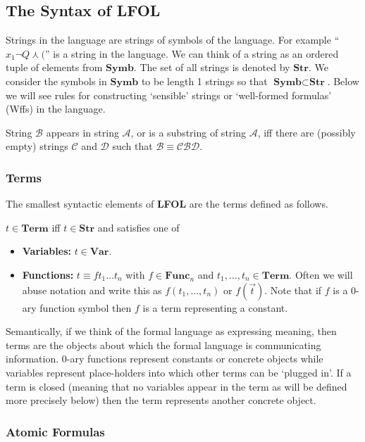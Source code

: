 \documentclass[12pt]{article}
\newcommand{\mc}[1]{\mathcal{#1}}
\begin{document}
\subsection{The Syntax of LFOL}

Strings in the language are strings of symbols of the language. For example ``$x_1 \lnot Q \curlywedge ($'' is a string in the language. We can think of a string as an ordered tuple of elements from $\textbf{Symb}$. The set of all strings is denoted by $\textbf{Str}$.
We consider the symbols in $\textbf{Symb}$ to be length 1 strings so that $\textbf{Symb} \subset \textbf{Str}$.
Below we will see rules for constructing `sensible' strings or `well-formed formulas' (Wffs) in the language.

String $\mc{B}$ appears in string $\mc{A}$, or is a substring of string $\mc{A}$, iff there are (possibly empty) strings $\mc{C}$ and $\mc{D}$ such that $\mc{B}\equiv \mc{C}\mc{B}\mc{D}$.

\hrulefill

\subsubsection*{Terms}

The smallest syntactic elements of \textbf{LFOL} are the terms defined as follows.

$t \in \textbf{Term}$ iff $t \in \textbf{Str}$ and satisfies one of
\begin{itemize}
\item{\textbf{Variables:} $t \in \textbf{Var}$.}
\item{\textbf{Functions:} $t \equiv ft_1 \ldots t_n$ with $f \in \textbf{Func}_n$ and $t_1, \ldots, t_n \in \textbf{Term}$. Often we will abuse notation and write this as $f(t_1, \ldots, t_n)$ or $f(\vec{t})$. Note that if $f$ is a 0-ary function symbol then $f$ is a term representing a constant.}
\end{itemize}

Semantically, if we think of the formal language as expressing meaning, then terms are the objects about which the formal language is communicating information. 0-ary functions represent constants or concrete objects while variables represent place-holders into which other terms can be `plugged in'.
If a term is closed (meaning that no variables appear in the term as will be defined more precisely below) then the term represents another concrete object.

\hrulefill 

\subsubsection*{Atomic Formulas}
\end{document}
